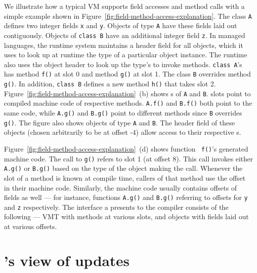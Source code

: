 

We illustrate how a typical VM supports field accesses and method calls
with a simple example shown in
Figure~\ref{fig:field-method-access-explanation}. The class {\tt A} defines two
integer fields {\tt x} and {\tt y}. Objects of type {\tt A} have these
fields laid out contiguously. Objects of {\tt class B} have an additional
integer field {\tt z}. In managed languages, the runtime system maintains a header
field for all objects, which it uses to look up at runtime the type of a particular
object instance. The runtime also uses the object header to look up the
type's \VMT to invoke methods.
{\tt class A}'s
\VMT has method {\tt f()} at slot 0 and method {\tt g()} at slot 1. The
class
{\tt B} overrides method {\tt g()}. In addition, {\tt class B} defines a
new method {\tt h()} that takes slot 2.
Figure~\ref{fig:field-method-access-explanation}~(b) shows
\VMT{}s of {\tt A} and {\tt B}. \VMT slots point to compiled machine code
of respective methods. {\tt A.f()} and {\tt B.f()} both point to the same
code, while {\tt A.g()} and {\tt B.g()} point to different methods since
{\tt B} overrides {\tt g()}. The figure also shows objects of type {\tt A} and
{\tt B}.  The header field of these objects (chosen arbitrarily to be
at offset -4) allow access to their respective \VMT{}s.

Figure~\ref{fig:field-method-access-explanation}~(d) shows function {\tt
f()}'s generated machine code. The call to {\tt g()} refers to \VMT slot 1
(at offset 8). This call invokes either {\tt A.g()} or {\tt B.g()} based on
the type of the object making the call.  Whenever the \VMT slot of a method
is known at compile time, callers of that method use the offset in their
machine code. Similarly, the machine code usually contains offsets of
fields as well --- for instance, functions {\tt A.g()} and {\tt B.g()}
referring to offsets for {\tt y} and {\tt z} respectively. The interface a \VM
presents to the compiler consists of the following --- \acl{VMT} with methods
at various slots, and objects with fields laid out at various offsets.

\section{\JV's view of updates}

